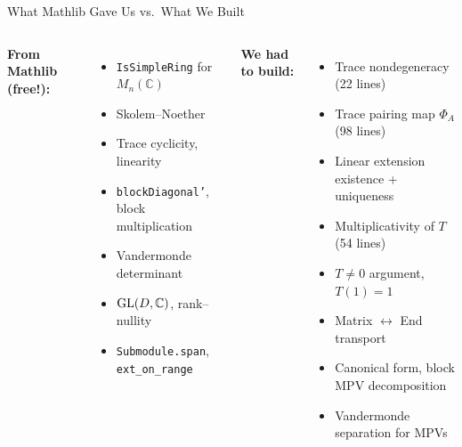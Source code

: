 \documentclass[aspectratio=169,10pt]{beamer}
\begin{document}
\begin{frame}{What Mathlib Gave Us vs.\ What We Built}
\begin{columns}[T]
\textbf{\textcolor{leanblue}{From Mathlib (free!):}}
\begin{itemize}
  \item[\textcolor{leanblue}{$\blacksquare$}] \texttt{IsSimpleRing} for $M_n(\mathbb{C})$
  \item[\textcolor{leanblue}{$\blacksquare$}] Skolem--Noether
  \item[\textcolor{leanblue}{$\blacksquare$}] Trace cyclicity, linearity
  \item[\textcolor{leanblue}{$\blacksquare$}] \texttt{blockDiagonal'}, block multiplication
  \item[\textcolor{leanblue}{$\blacksquare$}] Vandermonde determinant
  \item[\textcolor{leanblue}{$\blacksquare$}] $\mathrm{GL}(D,\mathbb{C})$, rank--nullity
  \item[\textcolor{leanblue}{$\blacksquare$}] \texttt{Submodule.span}, \texttt{ext\_on\_range}
\end{itemize}

\textbf{\textcolor{leangreen}{We had to build:}}
\begin{itemize}
  \item[\textcolor{leangreen}{$\blacksquare$}] Trace nondegeneracy (22 lines)
  \item[\textcolor{leangreen}{$\blacksquare$}] Trace pairing map $\Phi_A$ (98 lines)
  \item[\textcolor{leangreen}{$\blacksquare$}] Linear extension existence + uniqueness
  \item[\textcolor{leangreen}{$\blacksquare$}] Multiplicativity of $T$ (54 lines)
  \item[\textcolor{leangreen}{$\blacksquare$}] $T\neq 0$ argument, $T(1)=1$
  \item[\textcolor{leangreen}{$\blacksquare$}] Matrix $\leftrightarrow$ End transport
  \item[\textcolor{leangreen}{$\blacksquare$}] Canonical form, block MPV decomposition
  \item[\textcolor{leangreen}{$\blacksquare$}] Vandermonde separation for MPVs
\end{itemize}
\end{columns}
\end{frame}
\end{document}

